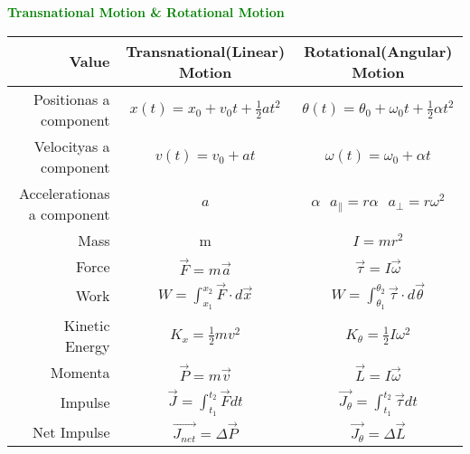 \documentclass[12pt,letterpaper,fleqn]{article}
\begin{document}
\begin{center}
\textcolor{green}{\LARGE\bf Transnational Motion \& Rotational Motion  }
\end{center}

\begin{table}[htb]
\begin{center}
	\begin{tabular}{|r||c|c|}\hline
	Value & Transnational(Linear) Motion & Rotational(Angular) Motion \\\hline\hline
    Position{\tiny as a component} & $x(t) = x_0 + v_0t + \frac{1}{2}at^2 $ &
     $\theta(t) = \theta_0 + \omega_0t + \frac{1}{2} \alpha t^2$ \\\hline
    Velocity{\tiny as a component} & $ v(t) = v_0 + at $ & 
    $\omega(t) = \omega_0 + \alpha t $\\\hline
    Acceleration{\tiny as a component} & $ a $ & $\alpha \ \ \  a_{\parallel} = r\alpha \ \ \  a_{\bot} = r\omega^2 $\\\hline
    Mass & m & $ I = mr^2 $\\\hline
    Force & $\vec{F} = m\vec{a}$ & $\vec{\tau} = I\vec{\omega}$ \\\hline
    Work & $ W = \int_{x_1}^{x_2} \vec{F}\cdot d\vec{x}$ & $ W =\int_{\theta_1}^{\theta_2} \vec{\tau} \cdot d\vec{\theta}$\\\hline
    Kinetic Energy & $K_x = \frac{1}{2}mv^2 $ & $K_{\theta} = \frac{1}{2}I\omega^2 $\\\hline
    Momenta & $\vec{P} = m\vec{v} $ & $\vec{L} = I\vec{\omega} $\\\hline
    Impulse & $\vec{J} = \int_{t_1}^{t_2} \vec{F}dt $ & $ \vec{J_\theta} = \int_{t_1}^{t_2} \vec{\tau}dt$ \\\hline
    Net Impulse & $\vec{J_{net}} = \Delta \vec{P}$& $\vec{J_{\theta}} = \Delta \vec{L}$\\\hline
	\end{tabular} 
\end{center}
\end{table}
\end{document}
